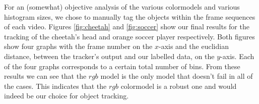 \documentclass[11pt]{article}
\begin{document}
For an (somewhat) objective analysis of the various colormodels and various
histogram sizes, we chose to manually tag the objects within the frame
sequences of each video. Figures \ref{fig:cheetah} and \ref{fig:soccer} show
our final results for the tracking of the cheetah's head and orange soccer
player respectively.  
Both figures show four graphs with the frame number on the $x$-axis and the
euclidian distance, between the tracker's output and our labelled data, on the
$y$-axis. Each of the four graphs corresponds to a certain total number of
bins. From these results we can see that the $rgb$ model is the only model that
doesn't fail in all of the cases. This indicates that the $rgb$ colormodel is a
robust one and would indeed be our choice for object tracking.
\begin{figure}[!ht]
\centering
{}
\\
\end{figure}
\end{document}

